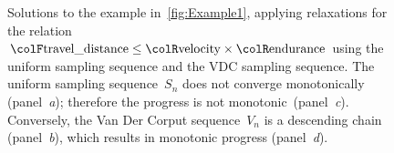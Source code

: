 \begin{center}
\begin{figure}[t]
\begin{centering}
{\begin{centering}
\par\end{centering}
}
\par\end{centering}
\caption{Solutions to the example in~\cref{fig:Example1}, applying relaxations
for the relation ${\colF\text{travel\_distance}}\leq{\colR\text{velocity}}\times{\colR\text{endurance}}$
using the uniform sampling sequence and the VDC sampling sequence.
The uniform sampling sequence~$S_{n}$ does not converge monotonically
(panel~\emph{a}); therefore the progress is not monotonic~(panel\emph{~c}).
Conversely, the Van Der Corput sequence~$V_{n}$ is a descending
chain (panel~\emph{b}), which results in monotonic progress (panel~\emph{d}).}
\end{figure}
\par\end{center}

